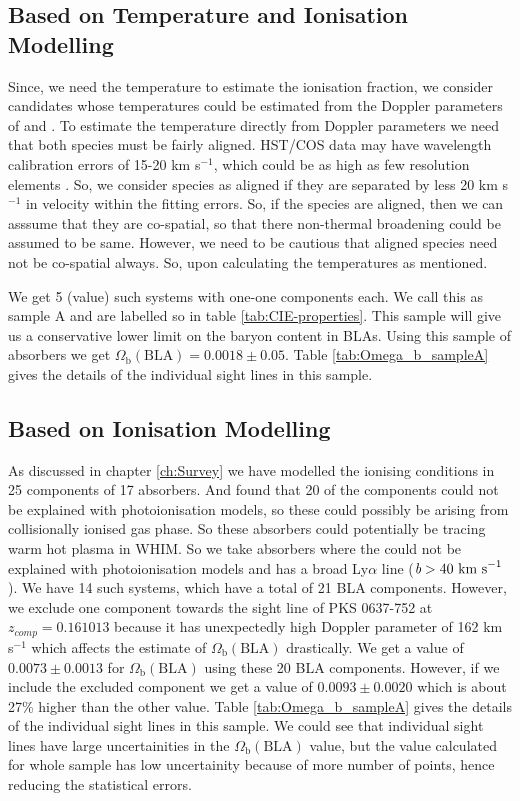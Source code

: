 \subsection{Based on Temperature and Ionisation Modelling}

Since, we need the temperature to estimate the ionisation fraction, we consider candidates whose temperatures could be estimated from the Doppler parameters of  and . To estimate the temperature directly from Doppler parameters we need that both species must be fairly aligned. HST/COS data may have wavelength calibration errors of 15-20 km s$^{-1}$, which could be as high as few resolution elements \citep{Wakker-2015}. So, we consider species as aligned if they are separated by less 20 km s$^{-1}$ in velocity within the fitting errors. So, if the species are aligned, then we can asssume that they are co-spatial, so that there non-thermal broadening could be assumed to be same. However, we need to be cautious that aligned species need not be co-spatial always. So, upon calculating the temperatures as mentioned.

We get 5 (value) such systems with one-one components each. We call this as sample A and are labelled so in table \ref{tab:CIE-properties}. This sample will give us a conservative lower limit on the baryon content in BLAs. Using this sample of absorbers we get $\Omega_\text{b}(\text{BLA})=0.0018 \pm 0.05$. Table \ref{tab:Omega_b_sampleA} gives the details of the individual sight lines in this sample.  


\subsection{Based on Ionisation Modelling} \label{sec:sampleB}

As discussed in chapter \ref{ch:Survey} we have modelled the ionising conditions in 25 components of 17  absorbers. And found that 20 of the components could not be explained with photoionisation models, so these could possibly be arising from collisionally ionised gas phase. So these absorbers could potentially be tracing warm hot plasma in WHIM. So we take absorbers where the  could not be explained with photoionisation models and has a broad Ly$\alpha$ line ($\emph{b}>40 \ \text{km s}^{-1}$). We have 14 such systems, which have a total of 21 BLA components. However, we exclude one component towards the sight line of PKS 0637-752 at $z_{comp}=0.161013$ because it has unexpectedly high Doppler parameter of 162 km s$^{-1}$ which affects the estimate of $\Omega_\text{b}(\text{BLA})$ drastically. We get a value of $0.0073 \pm 0.0013$ for $\Omega_\text{b}(\text{BLA})$ using these 20 BLA components. However, if we include the excluded component we get a value of $0.0093 \pm 0.0020$ which is about 27\% higher than the other value. Table \ref{tab:Omega_b_sampleA} gives the details of the individual sight lines in this sample. We could see that individual sight lines have large uncertainities in the $\Omega_\text{b}(\text{BLA})$ value, but the value calculated for whole sample has low uncertainity because of more number of points, hence reducing the statistical errors. 


